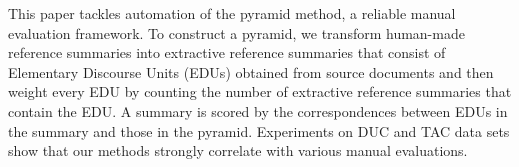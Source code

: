 This paper tackles automation of the pyramid method, a reliable manual evaluation framework. To construct a pyramid, we transform human-made reference summaries into extractive reference summaries that consist of Elementary Discourse Units (EDUs) obtained from source documents and then weight every EDU by counting the number of extractive reference summaries that contain the EDU. A summary is scored by the correspondences between EDUs in the summary and those in the pyramid. Experiments on DUC and TAC data sets show that our methods strongly correlate with various manual evaluations.
